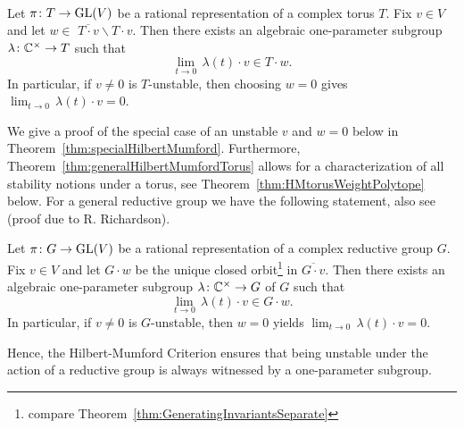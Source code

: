 \begin{theorem} \label{thm:generalHilbertMumfordTorus}
	\ \\
	Let $\pi \colon T \to \operatorname{GL}(V)$ be a rational representation of a complex torus $T$. Fix $v \in V$ and let $w \in $ $\overline{T \cdot v} \backslash T \cdot v $. Then there exists an algebraic one-parameter subgroup $\lambda \colon \mathbb C^\times \to T$ such that
		\[ \lim_{t \to 0} \, \lambda(t) \cdot v \in T \cdot w. \]
	In particular, if $v \neq 0$ is $T$-unstable, then choosing $w=0$ gives $\lim_{t \to 0} \, \lambda(t) \cdot v = 0$.
\end{theorem}

We give a proof of the special case of an unstable $v$ and $w=0$ below in Theorem~\ref{thm:specialHilbertMumford}. Furthermore, Theorem~\ref{thm:generalHilbertMumfordTorus} allows for a characterization of all stability notions under a torus, see Theorem~\ref{thm:HMtorusWeightPolytope} below.
For a general reductive group we have the following statement, also see \cite[Theorem~4.2]{birkes1971orbits} (proof due to R. Richardson).

\begin{theorem}
	\label{thm:HilbertMumfordReductive}
	Let $\pi \colon G \to \operatorname{GL}(V)$ be a rational representation of a complex reductive group $G$. Fix $v \in V$ and let $G \cdot w$ be the unique closed orbit\footnote{compare Theorem~\ref{thm:GeneratingInvariantsSeparate}}
	in $\overline{G \cdot v}$. Then there exists an algebraic one-parameter subgroup $\lambda \colon \mathbb C^\times \to G$ of $G$ such that
		\[ \lim_{t \to 0} \, \lambda(t) \cdot v \in G \cdot w. \]
	In particular, if $v \neq 0$ is $G$-unstable, then $w=0$ yields $\lim_{t \to 0} \, \lambda(t) \cdot v = 0$.
\end{theorem}

Hence, the Hilbert-Mumford Criterion ensures that being unstable under the action of a reductive group is always witnessed by a one-parameter subgroup.

